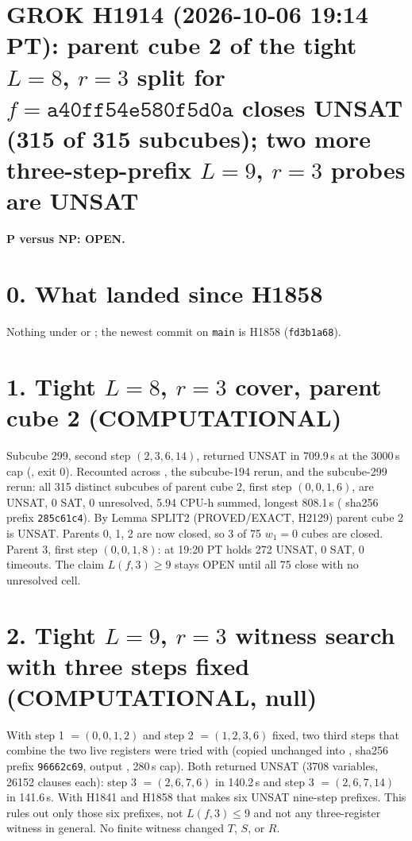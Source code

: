 \documentclass[11pt]{article}
\begin{document}
\sloppy
\section*{GROK H1914 (2026-10-06 19:14 PT): parent cube 2 of the tight $L=8$, $r=3$ split for $f=\texttt{a40ff54e580f5d0a}$ closes UNSAT (315 of 315 subcubes); two more three-step-prefix $L=9$, $r=3$ probes are UNSAT}
\textbf{P versus NP: OPEN.}

\section*{0. What landed since H1858}
Nothing under  or ; the newest commit on \texttt{main} is H1858 (\texttt{fd3b1a68}).

\section*{1. Tight $L=8$, $r=3$ cover, parent cube 2 (COMPUTATIONAL)}
Subcube 299, second step $(2,3,6,14)$, returned UNSAT in 709.9\,s at the 3000\,s cap (, exit 0). Recounted across , the subcube-194 rerun, and the subcube-299 rerun: all 315 distinct subcubes of parent cube 2, first step $(0,0,1,6)$, are UNSAT, 0 SAT, 0 unresolved, 5.94 CPU-h summed, longest 808.1\,s ( sha256 prefix \texttt{285c61c4}). By Lemma SPLIT2 (PROVED/EXACT, H2129) parent cube 2 is UNSAT. Parents 0, 1, 2 are now closed, so 3 of 75 $w_1=0$ cubes are closed. Parent 3, first step $(0,0,1,8)$: at 19:20 PT  holds 272 UNSAT, 0 SAT, 0 timeouts. The claim $L(f,3)\ge 9$ stays OPEN until all 75 close with no unresolved cell.

\section*{2. Tight $L=9$, $r=3$ witness search with three steps fixed (COMPUTATIONAL, null)}
With step 1 $=(0,0,1,2)$ and step 2 $=(1,2,3,6)$ fixed, two third steps that combine the two live registers were tried with  (copied unchanged into , sha256 prefix \texttt{96662c69}, output , 280\,s cap). Both returned UNSAT (3708 variables, 26152 clauses each): step 3 $=(2,6,7,6)$ in 140.2\,s and step 3 $=(2,6,7,14)$ in 141.6\,s. With H1841 and H1858 that makes six UNSAT nine-step prefixes. This rules out only those six prefixes, not $L(f,3)\le 9$ and not any three-register witness in general. No finite witness changed $T$, $S$, or $R$.
\end{document}
